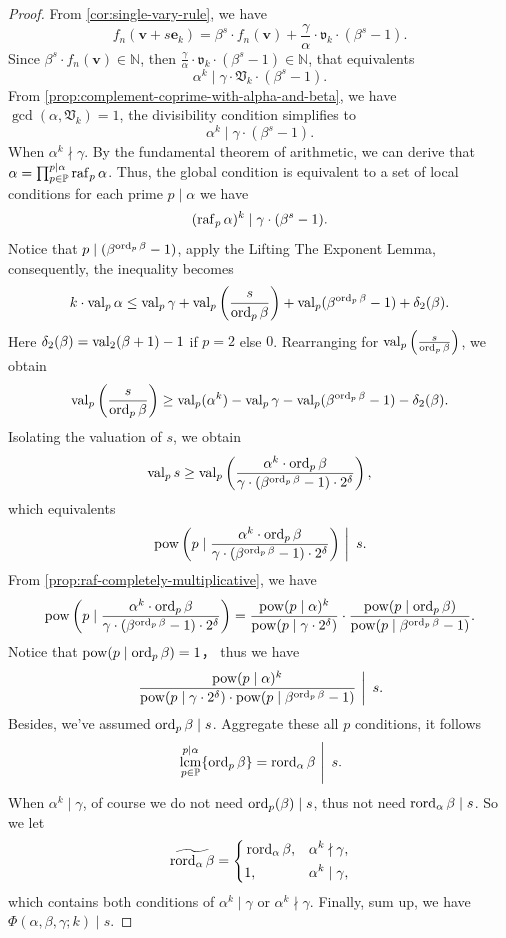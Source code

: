\begin{proof}
    From \cref{cor:single-vary-rule}, we have
    \[ f_{n}(\bm{v}+s\bm{e}_{k}) = \beta^{s}\cdot f_{n}(\bm{v}) + \frac{\gamma}{\alpha}\cdot\mathfrak{v}_{k}\cdot(\beta^{s} - 1). \]
    Since $\beta^{s}\cdot f_{n}(\bm{v}) \in \mathbb{N}$, then $\frac{\gamma}{\alpha}\cdot\mathfrak{v}_{k}\cdot(\beta^{s} - 1) \in \mathbb{N}$, that equivalents
    \[\alpha^{k} \mid \gamma\cdot\mathfrak{V}_{k}\cdot(\beta^{s} - 1).\]
    From \cref{prop:complement-coprime-with-alpha-and-beta}, we have $\gcd(\alpha, \mathfrak{V}_{k}) = 1$, the divisibility condition simplifies to
    \[\alpha^{k} \mid \gamma\cdot(\beta^{s} - 1).\]
    When $\alpha^{k} \nmid \gamma$.
    By the fundamental theorem of arithmetic, we can derive that $\alpha = \prod_{p \in \mathbb{P}}^{p \mid \alpha} \operatorname{raf}_{p}\alpha$. Thus, the global condition is equivalent to a set of local conditions for each prime $p \mid \alpha$ we have
    \[ (\operatorname{raf}_{p}\alpha)^{k} \mid \gamma\cdot(\beta^{s} - 1). \]
    Notice that $p \mid (\beta^{\operatorname{ord}_{p}\beta} - 1)$, apply the Lifting The Exponent Lemma, consequently, the inequality becomes
    \[ k\cdot\operatorname{val}_{p}\alpha \le \operatorname{val}_{p}\gamma + \operatorname{val}_{p}\left(\frac{s}{\operatorname{ord}_{p}\beta}\right) + \operatorname{val}_{p}(\beta^{\operatorname{ord}_{p}\beta} - 1) + \delta_2(\beta). \]
    Here $\delta_2(\beta) = \operatorname{val}_2(\beta + 1) - 1$ if $p = 2$ else $0$.
    Rearranging for $\operatorname{val}_{p}\left(\frac{s}{\operatorname{ord}_{p}\beta}\right)$, we obtain
    \[ \operatorname{val}_{p}\left(\frac{s}{\operatorname{ord}_{p}\beta}\right) \ge \operatorname{val}_{p}(\alpha^{k}) - \operatorname{val}_{p}\gamma - \operatorname{val}_{p}(\beta^{\operatorname{ord}_{p}\beta} - 1) - \delta_2(\beta). \]
    Isolating the valuation of $s$, we obtain
    \[ \operatorname{val}_{p}s \ge \operatorname{val}_{p}\left(\frac{\alpha^{k}\cdot\operatorname{ord}_{p}\beta}{\gamma\cdot(\beta^{\operatorname{ord}_{p}\beta} - 1)\cdot2^{\delta}}\right), \]
    which equivalents
    \[ \left.\operatorname{pow}\left(p\mid\frac{\alpha^{k}\cdot\operatorname{ord}_{p}\beta}{\gamma\cdot(\beta^{\operatorname{ord}_{p}\beta} - 1)\cdot2^{\delta}}\right)\ \right\vert\ s. \]
    From \cref{prop:raf-completely-multiplicative}, we have
    \[ \operatorname{pow}\left(p\mid\frac{\alpha^{k}\cdot\operatorname{ord}_{p}\beta}{\gamma\cdot(\beta^{\operatorname{ord}_{p}\beta} - 1)\cdot2^{\delta}}\right) = \frac{\operatorname{pow}(p\mid\alpha)^{k}}{\operatorname{pow}(p\mid\gamma\cdot2^{\delta})}\cdot\frac{\operatorname{pow}(p\mid\operatorname{ord}_{p}\beta)}{\operatorname{pow}(p\mid\beta^{\operatorname{ord}_{p}\beta} - 1)}. \]
    Notice that $\operatorname{pow}(p\mid\operatorname{ord}_{p}\beta) = 1$， thus we have
    \[ \left. \frac{\operatorname{pow}(p\mid\alpha)^{k}}{\operatorname{pow}(p\mid\gamma\cdot2^{\delta})\cdot\operatorname{pow}(p\mid\beta^{\operatorname{ord}_{p}\beta} - 1)}\ \right\vert\ s. \]
    Besides, we've assumed $\operatorname{ord}_{p}\beta \mid s$. Aggregate these all $p$ conditions, it follows
    \[ \left.\operatorname*{lcm}_{p\in\mathbb{P}}^{p\mid \alpha}\{\operatorname{ord}_{p}\beta\} = \operatorname{rord}_{\alpha}\beta\ \right\vert\ s. \]
    When $\alpha^{k}\mid \gamma$, of course we do not need $\operatorname{ord}_{p}(\beta) \mid s$, thus not need $\operatorname{rord}_{\alpha}\beta\mid s$.
    So we let
    \[ \widetilde{\operatorname{rord}_{\alpha}\beta} = \left\{\begin{aligned}
        &\operatorname{rord}_{\alpha}\beta, && \alpha^{k}\nmid \gamma, \\
        &1, && \alpha^{k}\mid \gamma,
    \end{aligned}\right. \]
    which contains both conditions of $\alpha^{k}\mid \gamma$ or $\alpha^{k}\nmid \gamma$.
    Finally, sum up, we have $\Phi(\alpha,\beta,\gamma;k) \mid s$.
\end{proof}
